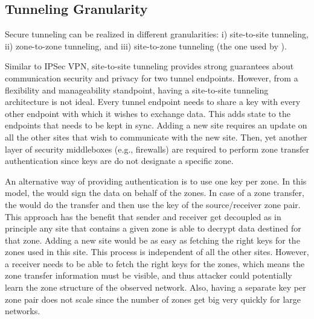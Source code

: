 \subsection{Tunneling Granularity} %
\label{ssec:granularity}
Secure tunneling can be realized in different granularities: i) site-to-site tunneling, 
ii) zone-to-zone tunneling, and iii) site-to-zone tunneling (the one used by \name). 

Similar to IPSec VPN, site-to-site tunneling provides strong guarantees about communication
security and privacy for two tunnel endpoints.
However, from a flexibility and manageability standpoint, having a site-to-site tunneling 
architecture is not ideal. Every tunnel endpoint needs to share a key with every other 
endpoint with which it wishes to exchange data. This adds state to the endpoints that
needs to be kept in sync. Adding a new site requires an update on all the other sites that 
wish to communicate with the new site. Then, yet another layer of security middleboxes (e.g., firewalls) are required to perform zone transfer authentication since keys are do not designate a specific zone.

An alternative way of providing authentication is to use one key per zone. In this model, 
the \tp would sign the data on behalf of the zones. In case of a zone transfer, the \tp 
would do the transfer and then use the key of the source/receiver zone pair. This approach 
has the benefit that sender and receiver get decoupled as in principle any site that 
contains a given zone is able to decrypt data destined for that zone. Adding a new site 
would be as easy as fetching the right keys for the zones used in this site. This process 
is independent of all the other sites. However, a receiver \tp needs to be able to fetch
the right keys for the zones, which means the zone transfer information must be visible, 
and thus attacker could potentially learn the zone structure of the observed network. 
Also, having a separate key per zone pair does not scale since the number of zones get big 
very quickly for large networks.

